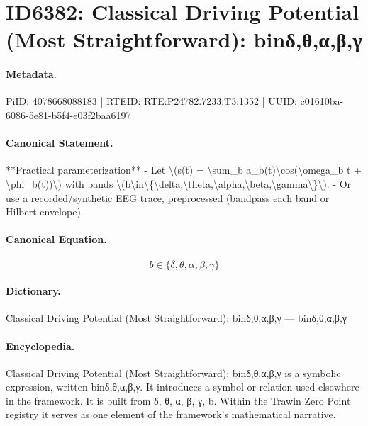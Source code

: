 \section*{ID6382: Classical Driving Potential (Most Straightforward): binδ,θ,α,β,γ}
\paragraph{Metadata.}
PiID: 4078668088183 | RTEID: RTE:P24782.7233:T3.1352 | UUID: c01610ba-6086-5e81-b5f4-e03f2baa6197

\paragraph{Canonical Statement.}
**Practical parameterization** - Let \textbackslash{}(s(t) = \textbackslash{}sum\_b a\_b(t)\textbackslash{}cos(\textbackslash{}omega\_b t + \textbackslash{}phi\_b(t))\textbackslash{}) with bands \textbackslash{}(b\textbackslash{}in\textbackslash{}\{\textbackslash{}delta,\textbackslash{}theta,\textbackslash{}alpha,\textbackslash{}beta,\textbackslash{}gamma\textbackslash{}\}\textbackslash{}). - Or use a recorded/synthetic EEG trace, preprocessed (bandpass each band or Hilbert envelope).

\paragraph{Canonical Equation.}
\[
b\in\{\delta,\theta,\alpha,\beta,\gamma\}
\]

\paragraph{Dictionary.}
Classical Driving Potential (Most Straightforward): binδ,θ,α,β,γ — binδ,θ,α,β,γ

\paragraph{Encyclopedia.}
Classical Driving Potential (Most Straightforward): binδ,θ,α,β,γ is a symbolic expression, written binδ,θ,α,β,γ. It introduces a symbol or relation used elsewhere in the framework. It is built from δ, θ, α, β, γ, b. Within the Trawin Zero Point registry it serves as one element of the framework's mathematical narrative.
